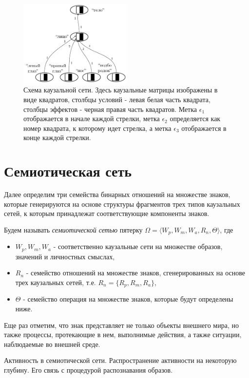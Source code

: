 \documentclass[12pt]{scrartcl}
\begin{document}
	\begin{figure}[H]
		\centering
		\includegraphics[width=0.5\textwidth]{automata/caus_net}
		\caption{Схема каузальной сети. Здесь каузальные матрицы изображены в виде квадратов, столбцы условий - левая белая часть квадрата, столбцы эффектов - черная правая часть квадратов. Метка $\epsilon_1$ отображается в начале каждой стрелки, метка $\epsilon_2$ определяется как номер квадрата, к которому идет стрелка, а метка $\epsilon_3$ отображается в конце каждой стрелки.}
		\label{fig:caus_net}		
	\end{figure}
	
	\section{Семиотическая сеть}
	
	Далее определим три семейства бинарных отношений на множестве знаков, которые  генерируются на основе структуры фрагментов трех типов каузальных сетей, к которым принадлежат соответствующие компоненты знаков.
		
	Будем называть \textit{семиотической сетью} пятерку $\Omega=\langle W_p, W_m, W_a, R_n, \Theta \rangle$, где
	\begin{itemize}
		\item $W_p, W_m, W_a$ - соответственно каузальные сети на множестве образов, значений и личностных смыслах,
		\item $R_n$ - семейство отношений на множестве знаков, сгенерированных на основе трех каузальных сетей, т.е. $R_n=\{R_p, R_m, R_a\}$,
		\item $\Theta$ - семейство операция на множестве знаков, которые будут определены ниже.
	\end{itemize} 
	
	Еще раз отметим, что знак представляет не только объекты внешнего мира, но также процессы, протекающие в нем, выполнимые действия, а также ситуации, наблюдаемые во внешней среде.

	Активность в семиотической сети. Распространение активности на некоторую глубину. Его связь с процедурой распознавания образов.
	
\end{document}
